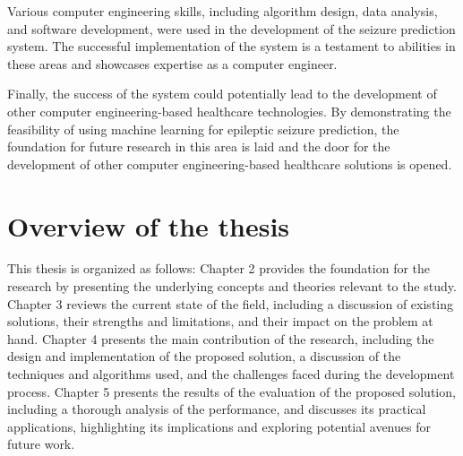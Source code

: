 Various computer engineering skills, including algorithm design, data analysis, and software development, were used in the development of the seizure prediction system. The successful implementation of the system is a testament to abilities in these areas and showcases expertise as a computer engineer.

Finally, the success of the system could potentially lead to the development of other computer engineering-based healthcare technologies. By demonstrating the feasibility of using machine learning for epileptic seizure prediction, the foundation for future research in this area is laid and the door for the development of other computer engineering-based healthcare solutions is opened.

\section{Overview of the thesis}

This thesis is organized as follows: Chapter 2 provides the foundation for the research by presenting the underlying concepts and theories relevant to the study. Chapter 3 reviews the current state of the field, including a discussion of existing solutions, their strengths and limitations, and their impact on the problem at hand. Chapter 4 presents the main contribution of the research, including the design and implementation of the proposed solution, a discussion of the techniques and algorithms used, and the challenges faced during the development process. Chapter 5 presents the results of the evaluation of the proposed solution, including a thorough analysis of the performance, and discusses its practical applications, highlighting its implications and exploring potential avenues for future work.